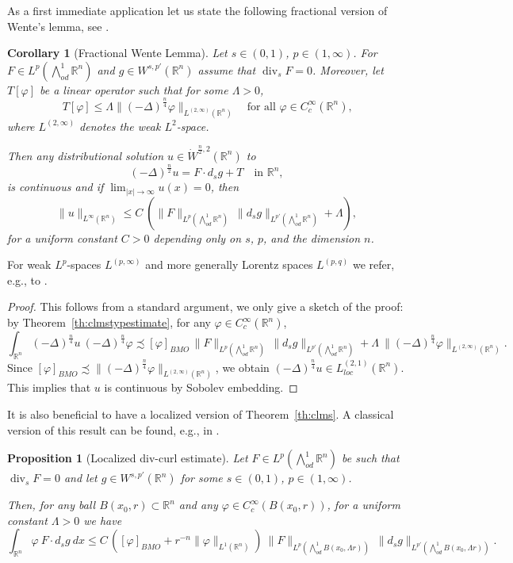 \documentclass[12pt]{amsart}
\newtheorem{corollary}[theorem]{Corollary}
\newtheorem{proposition}[theorem]{Proposition}
\theoremstyle{definition}
\newcommand{\R}{\mathbb{R}}
\newcommand{\brac}[1]{\left (#1 \right )}
\newcommand{\Ep}{\bigwedge\nolimits}
\numberwithin{theorem}{section} \numberwithin{equation}{section}
\renewcommand{\div}{\operatorname{div}}
\newcommand{\lap}{\Delta }
\newcommand{\aleq}{\precsim}
\newcommand{\laps}[1]{(-\lap)^{\frac{#1}{2}}}
\begin{document}
As a first immediate application let us state the following fractional version of Wente's lemma, see \cite{Wente69,BrC84,Tartar84}.

\begin{corollary}[Fractional Wente Lemma]\label{co:wentetypestimate}
Let $s \in (0,1)$, $p \in (1,\infty)$. For $F \in L^p(\Ep^1_{od} \R^n)$ and $g \in W^{s,p'}(\R^n)$ assume that $\div_s F = 0$. Moreover, let $T[\varphi]$ be a linear operator such that for some $\Lambda > 0$,
\[
 T[\varphi] \leq \Lambda \|(-\lap)^{\frac{n}{4}} \varphi \|_{L^{(2,\infty)}(\R^n)} \quad \mbox{for all $\varphi \in C_c^\infty(\R^n)$,}
\]
where $L^{(2,\infty)}$ denotes the weak $L^2$-space.

Then any distributional solution $u \in \dot{W}^{\frac{n}{2},2}(\R^n)$ to
\[
 \laps{n} u = F \cdot d_s g + T\quad \mbox{in $\R^n$},
\]
is continuous and if $\lim_{|x|\to\infty} u(x) = 0$, then
\[
 \|u\|_{L^\infty(\R^n)} \leq C\ \brac{\|F\|_{L^p(\Ep^1_{od} \R^n)}\ \|d_s g\|_{L^{p'}(\Ep^1_{od} \R^n)} + \Lambda},
\]
for a uniform constant $C > 0$ depending only on $s$, $p$, and the dimension $n$.
\end{corollary}
For weak $L^p$-spaces $L^{(p,\infty)}$ and more generally Lorentz spaces $L^{(p,q)}$ we refer, e.g., to \cite{GrafakosCF,Tartar-2007}.
\begin{proof}
This follows from a standard argument, we only give a sketch of the proof: by Theorem~\ref{th:clmstypestimate}, for any $\varphi \in C_c^\infty(\R^n)$,
\[
 \int_{\R^n} (-\lap)^{\frac{n}{4}} u\ (-\lap)^{\frac{n}{4}} \varphi \aleq [\varphi]_{BMO}\, \|F\|_{L^p(\Ep^1_{od} \R^n)}\, \|d_s g\|_{L^{p'}(\Ep^1_{od} \R^n)}+ \Lambda\ \|(-\lap)^{\frac{n}{4}} \varphi\|_{L^{(2,\infty)}(\R^n)}.
\]
Since $[\varphi]_{BMO} \aleq \|(-\lap)^{\frac{n}{4}} \varphi\|_{L^{(2,\infty)}(\R^n)}$, we obtain $(-\lap)^{\frac{n}{4}} u \in L^{(2,1)}_{loc}(\R^n)$. This implies that $u$ is continuous by Sobolev embedding. 
\end{proof}


It is also beneficial to have a localized version of Theorem~\ref{th:clms}. A classical version of this result can be found, e.g., in \cite[Corollary 3]{Strzelecki-1994}. 
\begin{proposition}[Localized div-curl estimate]\label{pr:localclms}
Let $F \in L^p(\Ep^1_{od} \R^n)$ be such that $\div_s F = 0$ and let $g \in W^{s,p'}(\R^n)$ for some $s \in (0,1)$, $p \in (1,\infty)$.

Then, for any ball $B(x_0,r) \subset \R^n$ and any $\varphi \in C_c^\infty(B(x_0,r))$, for a uniform constant $\Lambda > 0$ we have 
\[
 \int_{\R^n} \varphi\ F \cdot d_s g\ dx \leq C\, \brac{[\varphi]_{BMO} + r^{-n}\|\varphi\|_{L^1(\R^n)}}\ \|F\|_{L^p(\Ep^1_{od} B(x_0, \Lambda r))} \ \|d_s g\|_{L^{p'}(\Ep^1_{od} B(x_0,\Lambda r))}.
\]
\end{proposition}
\end{document}
